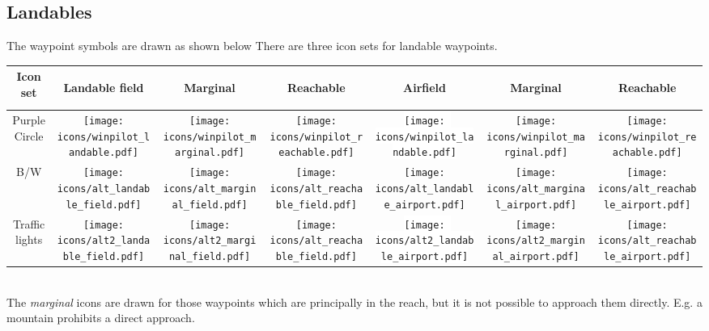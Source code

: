 \subsection*{Landables}
The waypoint symbols are drawn as shown below There are three icon sets for
landable waypoints. 

\begin{tabular}{c|ccc|ccc|}
Icon set
&\begin{sideways}Landable field\end{sideways}
&\begin{sideways}Marginal\end{sideways}
&\begin{sideways}Reachable\end{sideways}
&\begin{sideways}Airfield\end{sideways}
&\begin{sideways}Marginal\end{sideways}
&\begin{sideways}Reachable\end{sideways}\\
\hline
Purple Circle &
\texttt{[image: icons/winpilot\_landable.pdf]} &
\texttt{[image: icons/winpilot\_marginal.pdf]} &
\texttt{[image: icons/winpilot\_reachable.pdf]} &
\colorbox{white}{\texttt{[image: icons/winpilot\_landable.pdf]}} &
\texttt{[image: icons/winpilot\_marginal.pdf]} &
\texttt{[image: icons/winpilot\_reachable.pdf]} \\
\hline
B/W &
\texttt{[image: icons/alt\_landable\_field.pdf]} &
\texttt{[image: icons/alt\_marginal\_field.pdf]} &
\texttt{[image: icons/alt\_reachable\_field.pdf]} &
\colorbox[rgb]{0.94,0.94,0.94}{\texttt{[image: icons/alt\_landable\_airport.pdf]}} &
\texttt{[image: icons/alt\_marginal\_airport.pdf]} &
\texttt{[image: icons/alt\_reachable\_airport.pdf]} \\
\hline
Traffic lights &
\texttt{[image: icons/alt2\_landable\_field.pdf]} &
\texttt{[image: icons/alt2\_marginal\_field.pdf]} &
\texttt{[image: icons/alt\_reachable\_field.pdf]} &
\colorbox{white}{\texttt{[image: icons/alt2\_landable\_airport.pdf]}} &
\texttt{[image: icons/alt2\_marginal\_airport.pdf]} &
\texttt{[image: icons/alt\_reachable\_airport.pdf]} \\
\hline
\end{tabular} \\

The {\it marginal} icons are drawn for those waypoints which are principally in the
reach, but it is not possible to approach them directly. E.g. a mountain prohibits a direct approach.

